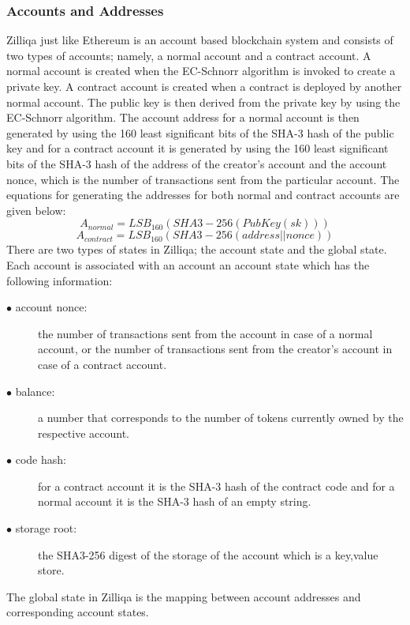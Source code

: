 \documentclass[a4paper,twoside,phd]{BYUPhys}
\begin{document}
\subsubsection{Accounts and Addresses}
Zilliqa just like Ethereum is an account based blockchain system and consists of two types of accounts; namely, a normal account and a contract account. A normal account is created when the EC-Schnorr algorithm is invoked to create a private key. A contract account is created when a contract is deployed by another normal account. The public key is then derived from the private key by using the EC-Schnorr algorithm. The account address for a normal account is then generated by using the 160 least significant bits of the SHA-3 hash of the public key and for a contract account it is generated by using the 160 least significant bits of the SHA-3 hash of the address of the creator's account and the account nonce, which is the number of transactions sent from the particular account. The equations for generating the addresses for both normal and contract accounts are given below:
\begin{equation}
    A_{normal} = LSB_{160}(SHA3-256(PubKey(sk)))
\end{equation}
\begin{equation}
    A_{contract} = LSB_{160}(SHA3-256(address||nonce))
\end{equation}
There are two types of states in Zilliqa; the account state and the global state.
Each account is associated with an account an account state which has the following information:
\begin{description}
\item[$\bullet$ account nonce:] the number of transactions sent from the account in case of a normal account, or the number of transactions sent from the creator's account in case of a contract account.
\item[$\bullet$ balance:] a number that corresponds to the number of tokens currently owned by the respective account.
\item[$\bullet$ code hash:] for a contract account it is the SHA-3 hash of the contract code and for a normal account it is the SHA-3 hash of an empty string.
\item[$\bullet$ storage root:] the SHA3-256 digest of the storage of the account which is a key,value store.
\end{description}
The global state in Zilliqa is the mapping between account addresses and corresponding account states. 
\end{document}
